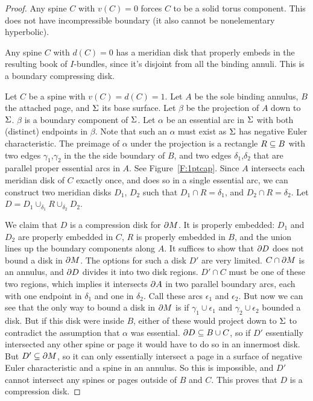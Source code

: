 \begin{proof}

Any spine $C$ with $v(C)=0$ forces $C$ to be a solid torus component. This does
not have incompressible boundary (it also cannot be nonelementary hyperbolic).

Any spine $C$ with $d(C)=0$ has a meridian disk that properly embeds in the
resulting book of $I$-bundles, since it's disjoint from all the binding annuli.
This is a boundary compressing disk.


Let $C$ be a spine with $v(C)=d(C)=1$. Let $A$ be the sole binding annulus, $B$
the attached page, and $\Sigma$ its base surface. Let $\beta$ be the projection of
$A$ down to $\Sigma$. $\beta$ is a boundary component of $\Sigma$. Let $\alpha$ be an
essential arc in $\Sigma$ with both (distinct) endpoints in $\beta$. Note that
such an $\alpha$ must exist as $\Sigma$ has negative Euler characteristic. The
preimage of $\alpha$ under the projection is a rectangle $R \subseteq B$ with two
edges $\gamma_1$,$\gamma_2$ in the the side boundary of $B$, and two edges
$\delta_1$,$\delta_2$ that are parallel proper essential arcs in $A$. See
Figure~\ref{F:1ptcap}. Since $A$ intersects each meridian disk of $C$ exactly
once, and does so in a single essential arc, we can construct two meridian
disks $D_1$, $D_2$ such that $D_1 \cap R = \delta_1$, and $D_2 \cap
R = \delta_2$.  Let $D = D_1 \cup_{\delta_1} R \cup_{\delta_2} D_2$.

We claim that $D$ is a compression disk for $\partial M$. It is properly embedded:
$D_1$ and $D_2$ are properly embedded in $C$, $R$ is properly embedded in $B$,
and the union lines up the boundary components along $A$. It suffices to show
that $\partial D$ does not bound a disk in $\partial M$. The options for such a disk $D'$
are very limited.  $C \cap \partial M$ is an annulus, and $\partial D$ divides it into
two disk regions. $D' \cap C$ must be one of these two regions, which implies
it intersects $\partial A$ in two parallel boundary arcs, each with one endpoint in
$\delta_1$ and one in $\delta_2$.  Call these arcs $\epsilon_1$ and
$\epsilon_2$.  But now we can see that the only way to bound a disk in $\partial M$
is if $\gamma_1 \cup \epsilon_1$ and $\gamma_2 \cup \epsilon_2$ bounded a disk.
But if this disk were inside $B$, either of these would project down to $\Sigma$
to contradict the assumption that $\alpha$ was essential. $\partial D \subseteq B \cup
C$, so if $D'$ essentially intersected any other spine or page it would have to
do so in an innermost disk. But $D' \subseteq \partial M$, so it can only essentially
intersect a page in a surface of negative Euler characteristic and a spine in
an annulus. So this is impossible, and $D'$ cannot intersect any spines or
pages outside of $B$ and $C$. This proves that $D$ is a compression disk.


\end{proof}
